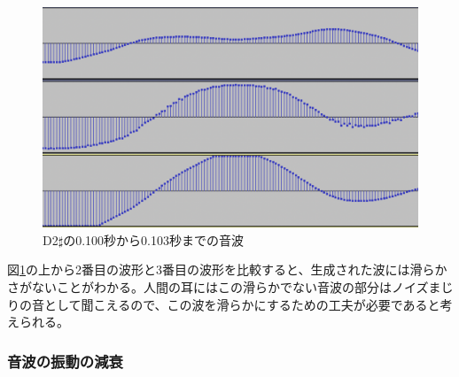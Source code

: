 \begin{figure}[b]
\begin{center}
\includegraphics[width=0.7\hsize]{figure/88_88_det/d2s_0100_0103.png}
\caption{D2$\sharp$の0.100秒から0.103秒までの音波}
\label{fig:88_88_smooth}
\end{center}
\end{figure}

図\ref{fig:88_88_smooth}の上から2番目の波形と3番目の波形を比較すると、生成された波には滑らかさがないことがわかる。人間の耳にはこの滑らかでない音波の部分はノイズまじりの音として聞こえるので、この波を滑らかにするための工夫が必要であると考えられる。

\subsubsection{音波の振動の減衰}

